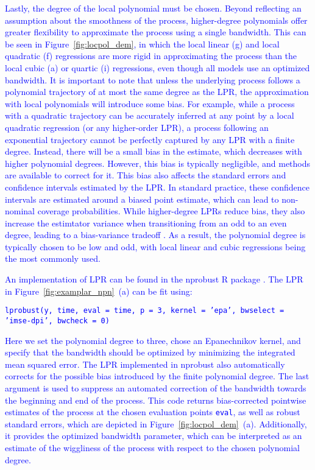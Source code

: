 \documentclass[man, floatsintext]{apa7}
\begin{document}
\textcolor{blue}{
  Lastly, the degree of the local polynomial must be chosen. Beyond reflecting
  an assumption about the smoothness of the process, higher-degree polynomials
  offer greater flexibility to approximate the process using a single
  bandwidth. This can be seen in Figure~\ref{fig:locpol_dem}, in which the
  local linear (g) and local quadratic (f) regressions are more rigid in
  approximating the process than the local cubic (a) or quartic (i)
  regressions, even though all models use an optimized bandwidth. It is
  important to note that unless the underlying process follows a polynomial
  trajectory of at most the same degree as the LPR, the approximation with
  local polynomials will introduce some bias. For example, while a process with
  a quadratic trajectory can be accurately inferred at any point by a local
  quadratic regression (or any higher-order LPR), a process following an
  exponential trajectory cannot be perfectly captured by any LPR with a finite
  degree. Instead, there will be a small bias in the estimate, which decreases
  with higher polynomial degrees. However, this bias is typically negligible,
  and methods are available to correct for it. This bias also affects the
  standard errors and confidence intervals estimated by the LPR\@. In standard
  practice, these confidence intervals are estimated around a biased point
  estimate, which can lead to non-nominal coverage probabilities. While
  higher-degree LPRs reduce bias, they also increase the estimtator variance
  when transitioning from an odd to an even degree, leading to a bias-variance
  tradeoff \parencite{ruppert_multivariate_1994}. As a result, the polynomial
  degree is typically chosen to be low and odd, with local linear and cubic
  regressions being the most commonly used.
}

\textcolor{blue}{
  An implementation of LPR can be found in the nprobust R package
  \parencite{R-nprobust}. The LPR in Figure~\ref{fig:examplar_npn}~(a) can be
  fit
  using:}

\textcolor{blue}{\fontsize{10}{12}\selectfont\texttt{lprobust(y, time, eval =
    time, p = 3, kernel = 'epa', bwselect = 'imse-dpi', bwcheck = 0)}}

\noindent\textcolor{blue}{Here we set the polynomial degree to three, chose an
  Epanechnikov kernel, and specify that the bandwidth should be optimized by
  minimizing the integrated mean squared error. The LPR implemented in nprobust
  also automatically corrects for the possible bias introduced by the finite
  polynomial degree. The last argument is used to suppress an automated
  correction of the bandwidth towards the beginning and end of the process.
  This code returns bias-corrected pointwise estimates of the process at the
  chosen evaluation points {\fontsize{10}{12}\selectfont\texttt{eval}}, as well
  as robust standard errors, which are depicted in
  Figure~\ref{fig:locpol_dem}~(a). Additionally, it provides the optimized
  bandwidth parameter, which can
  be interpreted as an estimate of the wiggliness of the process with respect
  to the chosen polynomial degree.
}
\end{document}
